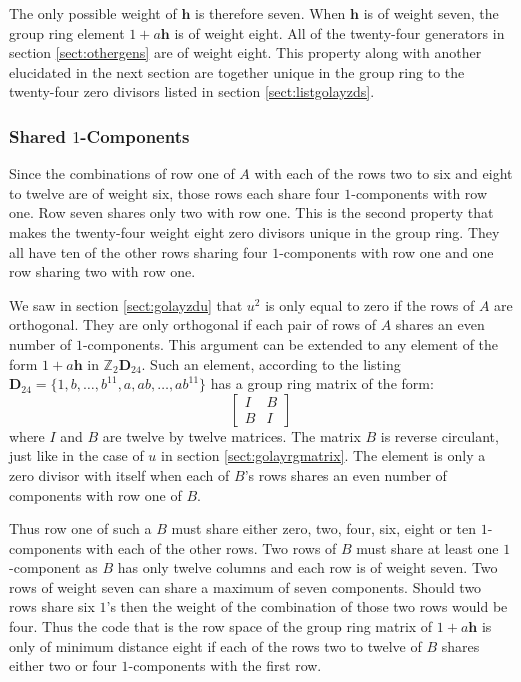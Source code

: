 The only possible weight of $\mathbf{h}$ is therefore seven.
When $\mathbf{h}$ is of weight seven, the group ring element $1+a\mathbf{h}$ is of weight eight.
All of the twenty-four generators in section \ref{sect:othergens} are of weight eight.
This property along with another elucidated in the next section are together unique in the group ring to the twenty-four zero divisors listed in section \ref{sect:listgolayzds}.

\subsubsection{Shared $1$-Components}
\label{sect:sharedonecomps}
Since the combinations of row one of $A$ with each of the rows two to six and eight to twelve are of weight six, those rows each share four $1$-components with row one.
Row seven shares only two with row one.
This is the second property that makes the twenty-four weight eight zero divisors unique in the group ring.
They all have ten of the other rows sharing four $1$-components with row one and one row sharing two with row one.

We saw in section \ref{sect:golayzdu} that $u^2$ is only equal to zero if the rows of $A$ are orthogonal.
They are only orthogonal if each pair of rows of $A$ shares an even number of $1$-components.
This argument can be extended to any element of the form $1+ a \mathbf{h}$ in $\mathbb{Z}_2 \mathbf{D}_{24}$.
Such an element, according to the listing $\mathbf{D}_{24} = \{ 1 , b, \ldots , b^{11} , a , ab , \ldots , ab^{11} \}$ has a group ring matrix of the form:
\[\left[ \begin{array}{c|c}
I & B \\
\hline
B & I
\end{array} \right] \]
where $I$ and $B$ are twelve by twelve matrices.
The matrix $B$ is reverse circulant, just like in the case of $u$ in section \ref{sect:golayrgmatrix}.
The element is only a zero divisor with itself when each of $B$'s rows shares an even number of components with row one of $B$.

Thus row one of such a $B$ must share either zero, two, four, six, eight or ten $1$-components with each of the other rows.
Two rows of $B$ must share at least one $1$-component as $B$ has only twelve columns and each row is of weight seven.
Two rows of weight seven can share a maximum of seven components.
Should two rows share six $1$'s then the weight of the combination of those two rows would be four.
Thus the code that is the row space of the group ring matrix of $1 + a \mathbf{h}$ is only of minimum distance eight if each of the rows two to twelve of $B$ shares either two or four $1$-components with the first row.

